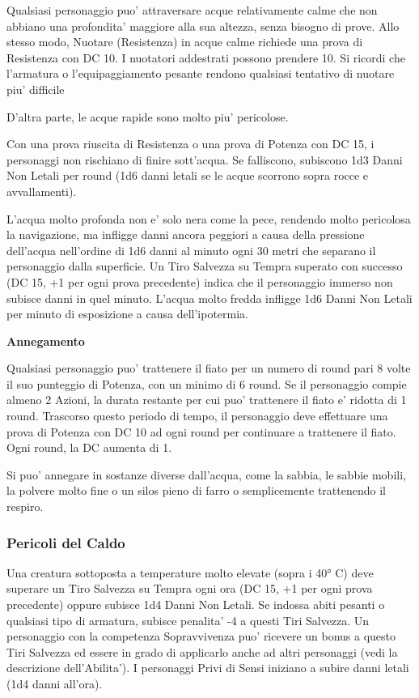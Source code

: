 \documentclass[a4paper,11pt,twoside,openany]{book}
\begin{document}
{\label{pericoli-dellacqua}

Qualsiasi personaggio puo' attraversare acque relativamente calme che non abbiano una profondita' maggiore alla sua altezza, senza bisogno di prove. Allo stesso modo, Nuotare (Resistenza) in acque calme richiede una prova di Resistenza con DC 10. I nuotatori addestrati possono prendere 10. Si ricordi che l'armatura o l'equipaggiamento pesante rendono qualsiasi tentativo di nuotare piu' difficile

D'altra parte, le acque rapide sono molto piu' pericolose.

Con una prova riuscita di Resistenza o una prova di Potenza con DC 15, i personaggi non rischiano di finire sott'acqua. Se falliscono, subiscono 1d3 Danni Non Letali per round (1d6 danni letali se le acque scorrono sopra rocce e avvallamenti).

L'acqua molto profonda non e' solo nera come la pece, rendendo molto pericolosa la navigazione, ma infligge danni ancora peggiori a causa della pressione dell'acqua nell'ordine di 1d6 danni al minuto ogni 30 metri che separano il personaggio dalla superficie. Un Tiro Salvezza su Tempra superato con successo (DC 15, +1 per ogni prova precedente) indica che il personaggio immerso non subisce danni in quel minuto. L'acqua molto fredda infligge 1d6 Danni Non Letali per minuto di esposizione a causa dell'ipotermia.

\textbf{Annegamento}

Qualsiasi personaggio puo' trattenere il fiato per un numero di round pari 8 volte il suo punteggio di Potenza, con un minimo di 6 round. Se il personaggio compie almeno 2 Azioni, la durata restante per cui puo' trattenere il fiato e' ridotta di 1 round. Trascorso questo periodo di tempo, il personaggio deve effettuare una prova di Potenza con DC 10 ad ogni round per continuare a trattenere il fiato. Ogni round, la DC aumenta di 1.

Si puo' annegare in sostanze diverse dall'acqua, come la sabbia, le sabbie mobili, la polvere molto fine o un silos pieno di farro o semplicemente trattenendo il respiro.

\subsubsection{Pericoli del Caldo}

\label{pericoli-del-caldo}

Una creatura sottoposta a temperature molto elevate (sopra i 40° C) deve superare un Tiro Salvezza su Tempra ogni ora (DC 15, +1 per ogni prova precedente) oppure subisce 1d4 Danni Non Letali. Se indossa abiti pesanti o qualsiasi tipo di armatura, subisce penalita' -4 a questi Tiri Salvezza. Un personaggio con la competenza Sopravvivenza puo' ricevere un bonus a questo Tiri Salvezza ed essere in grado di applicarlo anche ad altri personaggi (vedi la descrizione dell'Abilita'). I personaggi Privi di Sensi iniziano a subire danni letali (1d4 danni all'ora).

}
\end{document}
